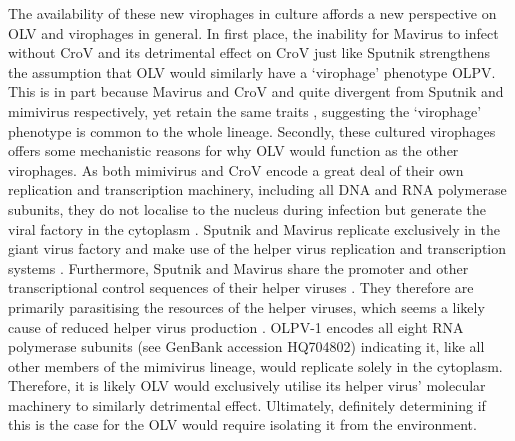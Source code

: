 The availability of these new virophages in culture affords a new perspective on \ac{OLV} and virophages in general.
In first place, the inability for Mavirus to infect without \ac{CroV} and its detrimental effect on \ac{CroV} just like Sputnik strengthens the assumption that OLV would similarly have a `virophage' phenotype \ac{OLPV}.
This is in part because Mavirus and \ac{CroV} and quite divergent from Sputnik and mimivirus respectively, yet retain the same traits \cite{Fischer2010, Fischer2011}, suggesting the `virophage' phenotype is common to the whole lineage.
Secondly, these cultured virophages offers some mechanistic reasons for why \ac{OLV} would function as the other virophages.
As both mimivirus and \ac{CroV} encode a great deal of their own replication and transcription machinery, including all \textsc{DNA} and \textsc{RNA} polymerase subunits, they do not localise to the nucleus during infection but generate the viral factory in the cytoplasm \cite{LaScola2008, Fischer2011}.
Sputnik and Mavirus replicate exclusively in the giant virus factory and make use of the helper virus replication and transcription systems \cite{LaScola2008, Fischer2011}.
Furthermore, Sputnik and Mavirus share the promoter and other transcriptional control sequences of their helper viruses \cite{Claverie2009, Fischer2011}.
They therefore are primarily parasitising the resources of the helper viruses, which seems a likely cause of reduced helper virus production \cite{Claverie2009, Fischer2011}.
\ac{OLPV}-1 encodes all eight \textsc{RNA} polymerase subunits (see GenBank accession HQ704802) indicating it, like all other members of the mimivirus lineage, would replicate solely in the cytoplasm.
Therefore, it is likely \ac{OLV} would exclusively utilise its helper virus' molecular machinery to similarly detrimental effect.
Ultimately, definitely determining if this is the case for the \ac{OLV} would require isolating it from the environment.

